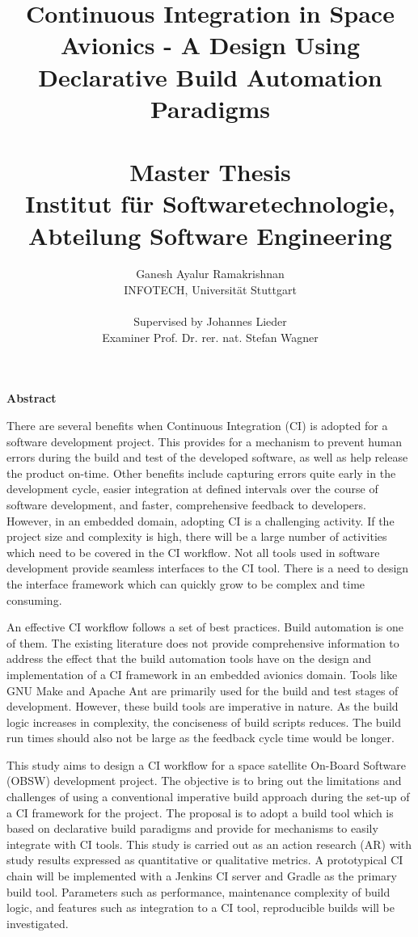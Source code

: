 \documentclass[12pt, a4paper, titlepage]{scrartcl}
\title{Continuous Integration in Space Avionics - A Design Using Declarative Build Automation Paradigms\\
\ \\
{\large Master Thesis \\
	Institut für Softwaretechnologie, \\
	Abteilung Software Engineering
\\
}
}
\author{Ganesh Ayalur Ramakrishnan  \\
  INFOTECH, Universität Stuttgart  \\
  \\
  Supervised by Johannes Lieder \\
  Examiner Prof. Dr. rer. nat. Stefan Wagner
}
\begin{document}
\maketitle

\textbf{Abstract}
\par There are several benefits when Continuous Integration (CI) is adopted for a software
development project. This provides for a mechanism to prevent human errors during
the build and test of the developed software, as well as help release the product on-time.
Other benefits include capturing errors quite early in the development cycle, easier integration
at defined intervals over the course of software development, and faster, comprehensive
feedback to developers. However, in an embedded domain, adopting CI is a challenging activity. If the project size and complexity is high, there will be a large number of activities which need to be covered in the CI workflow. Not all tools used in software development provide seamless interfaces to the CI tool. There is a need to design the interface framework which can quickly grow to be complex and time consuming. 
\par An effective CI workflow follows a set of best practices. Build automation is one of them. The existing literature does not provide comprehensive information to address the effect that the build
automation tools have on the design and implementation of a CI framework in an embedded
avionics domain. Tools like GNU Make and Apache Ant are primarily used for the build and
test stages of development. However, these build tools are imperative in nature. As the build logic increases in complexity, the conciseness of build scripts reduces. The build run times should also not be large as the feedback cycle time would be longer. 
\par This study aims to design a CI workflow for a space satellite On-Board Software (OBSW) development
project. The objective is to bring out the limitations and challenges of using a conventional imperative
build approach during the set-up of a CI framework for the project. The proposal
is to adopt a build tool which is based on declarative build paradigms and provide
for mechanisms to easily integrate with CI tools. This study is carried out as an action research
(AR) with study results expressed as quantitative or qualitative metrics. A prototypical CI chain will be implemented
with a Jenkins CI server and Gradle as the primary build tool. Parameters such as performance, maintenance complexity of build logic, and features such as integration to a CI tool, reproducible builds will be investigated. 
\end{document}

